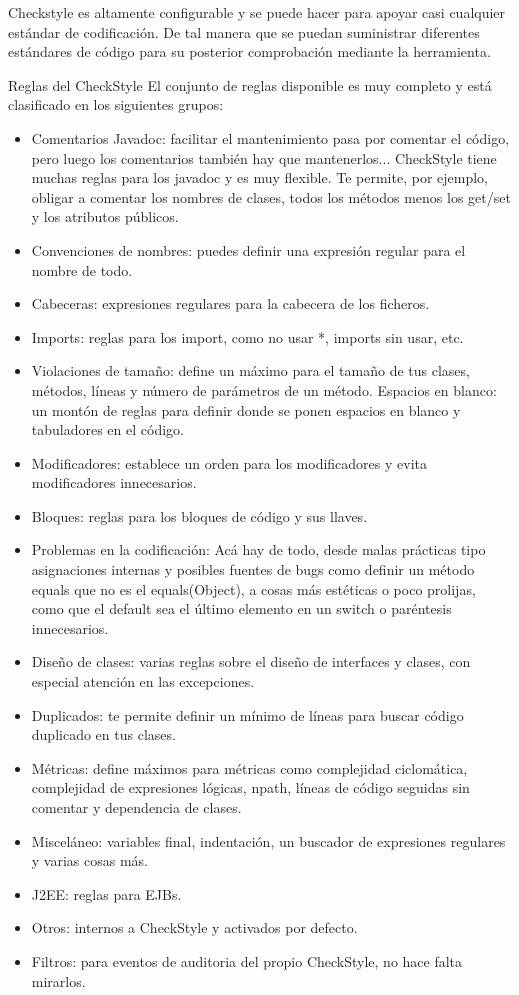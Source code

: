 \documentclass[DIV=calc,paper=a4,fontsize=11pt,onecolumn]{scrartcl} %
\begin{document}
	Checkstyle es altamente configurable y se puede hacer para apoyar casi cualquier estándar de codificación. De tal manera que se puedan suministrar diferentes estándares de código para su posterior comprobación mediante la herramienta.
	
	Reglas del CheckStyle
	El conjunto de reglas disponible es muy completo y está clasificado en los siguientes grupos:
	\begin{itemize}
		\item Comentarios Javadoc: facilitar el mantenimiento pasa por comentar el código, pero luego los comentarios también hay que mantenerlos... CheckStyle tiene muchas reglas para los javadoc y es muy flexible. Te permite, por ejemplo, obligar a comentar los nombres de clases, todos los métodos menos los get/set y los atributos públicos.
		\item Convenciones de nombres: puedes definir una expresión regular para el nombre de todo. 
		\item 	Cabeceras: expresiones regulares para la cabecera de los ficheros.
		\item Imports: reglas para los import, como no usar *, imports sin usar, etc.
		\item Violaciones de tamaño: define un máximo para el tamaño de tus clases, métodos, líneas y número de parámetros de un método.
		Espacios en blanco: un montón de reglas para definir donde se ponen espacios en blanco y tabuladores en el código.
		\item Modificadores: establece un orden para los modificadores y evita modificadores innecesarios.
		\item Bloques: reglas para los bloques de código y sus llaves.
		\item Problemas en la codificación: Acá hay de todo, desde malas prácticas tipo asignaciones internas y posibles fuentes de bugs como definir un método equals que no es el equals(Object), a cosas más estéticas o poco prolijas, como que el default sea el último elemento en un switch o paréntesis innecesarios.
		\item Diseño de clases: varias reglas sobre el diseño de interfaces y clases, con especial atención en las excepciones.
		\item Duplicados: te permite definir un mínimo de líneas para buscar código duplicado en tus clases.
		\item Métricas: define máximos para métricas como complejidad ciclomática, complejidad de expresiones lógicas, npath, líneas de código seguidas sin comentar y dependencia de clases.
		\item Misceláneo: variables final, indentación, un buscador de expresiones regulares y varias cosas más.
		\item J2EE: reglas para EJBs.
		\item Otros: internos a CheckStyle y activados por defecto.
		\item Filtros: para eventos de auditoria del propio CheckStyle, no hace falta mirarlos.
	\end{itemize}	
\end{document}
